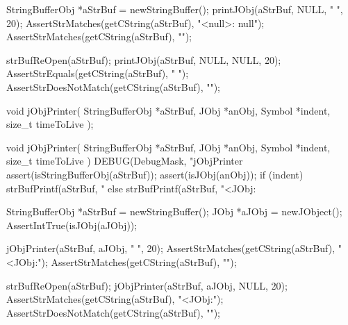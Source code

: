 
\startCTest
  StringBufferObj *aStrBuf = newStringBuffer();
  printJObj(aStrBuf, NULL, "  ", 20);
  AssertStrMatches(getCString(aStrBuf), "<null>: null");
  AssertStrMatches(getCString(aStrBuf), "\n");
  
  strBufReOpen(aStrBuf);
  printJObj(aStrBuf, NULL, NULL, 20);
  AssertStrEquals(getCString(aStrBuf), " ");
  AssertStrDoesNotMatch(getCString(aStrBuf), "\n");
\stopCTest
\stopTestCase
\stopTestSuite

\startTestSuite[jObjPrinter]

\startCHeader
void jObjPrinter(
  StringBufferObj *aStrBuf,
  JObj            *anObj,
  Symbol          *indent,
  size_t          timeToLive
);
\stopCHeader

\startCCode
void jObjPrinter(
  StringBufferObj *aStrBuf,
  JObj            *anObj,
  Symbol          *indent,
  size_t           timeToLive
) {
  DEBUG(DebugMask, "jObjPrinter %
  assert(isStringBufferObj(aStrBuf));
  assert(isJObj(anObj));
  if (indent) {
    strBufPrintf(aStrBuf, "%
  } else {
    strBufPrintf(aStrBuf, "<JObj:%
  }
}
\stopCCode


\startCTest
  StringBufferObj *aStrBuf = newStringBuffer();
  JObj *aJObj = newJObject();
  AssertIntTrue(isJObj(aJObj));
  
  jObjPrinter(aStrBuf, aJObj, "  ", 20);
  AssertStrMatches(getCString(aStrBuf), "<JObj:");
  AssertStrMatches(getCString(aStrBuf), "\n");

  strBufReOpen(aStrBuf);
  jObjPrinter(aStrBuf, aJObj, NULL, 20);
  AssertStrMatches(getCString(aStrBuf), "<JObj:");
  AssertStrDoesNotMatch(getCString(aStrBuf), "\n");
\stopCTest
\stopTestCase
\stopTestSuite